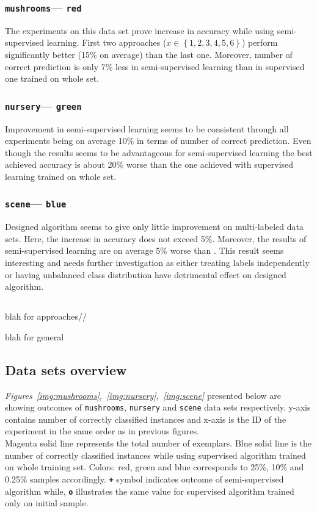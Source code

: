 \documentclass[12pt, a4paper, pdflatex]{report}
\begin{document}
\subsubsection{\texttt{mushrooms}--- \texttt{red}}
The experiments on this data set prove increase in accuracy while using semi-supervised learning. First two approaches ($x \in \left \{ 1, 2, 3 ,4, 5, 6 \right \}$) perform significantly better (15\% on average) than the last one. Moreover, number of correct prediction is only 7\% less in semi-supervised learning than in supervised one trained on whole set.

\subsubsection{\texttt{nursery}--- \texttt{green}}
Improvement in semi-supervised learning seems to be consistent through all experiments being on average 10\% in terms of number of correct prediction. Even though the results seems to be advantageous for semi-supervised learning the best achieved accuracy is about 20\% worse than the one achieved with supervised learning trained on whole set.

\subsubsection{\texttt{scene}--- \texttt{blue}}
Designed algorithm seems to give only little improvement on multi-labeled data sets. Here, the increase in accuracy does not exceed 5\%. Moreover, the results of semi-supervised learning are on average 5\% worse than . This result seems interesting and needs further investigation as either treating labels independently or having unbalanced class distribution have detrimental effect on designed algorithm.

\subsection*{}
blah for approaches//

blah for general



\subsection{Data sets overview}
\emph{Figures~\ref{img:mushrooms},~\ref{img:nursery},~\ref{img:scene}} presented below are showing outcomes of \texttt{mushrooms}, \texttt{nursery} and \texttt{scene} data sets respectively. y-axis contains number of correctly classified instances and x-axis is the ID of the experiment in the same order as in previous figures.\\
Magenta solid line represents the total number of exemplars. Blue solid line is the number of correctly classified instances while using supervised algorithm trained on whole training set. Colors: red, green and blue corresponds to 25\%, 10\% and 0.25\% samples accordingly. \texttt{\textbf{+}} symbol indicates outcome of semi-supervised algorithm while, \texttt{\textbf{o}} illustrates the same value for supervised algorithm trained only on initial sample.\\
\end{document}
